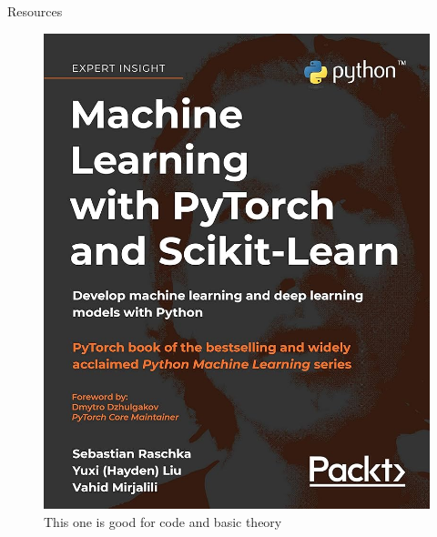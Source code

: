 \documentclass{beamer}
\begin{document}
\begin{frame}{Resources}
    \begin{figure}
        \centering
        \begin{minipage}{0.45\linewidth}
            \centering
            \includegraphics[width=\linewidth]{imgs/pytorch.jpg}
            \caption{This one is good for code and basic theory}
        \end{minipage}
        \hfill
        \begin{minipage}{0.45\linewidth}
            \centering

\end{minipage}
\end{figure}
\end{frame}
\end{document}
